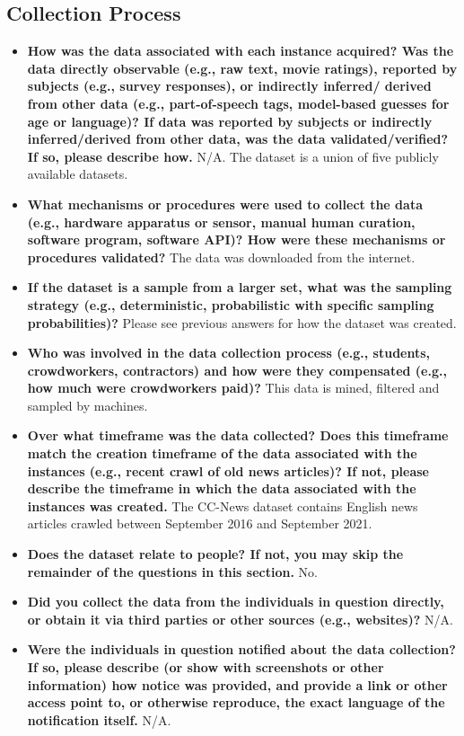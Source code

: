 \documentclass[11pt]{article}
\begin{document}
\subsection{Collection Process}
\begin{itemize}
    \item \textbf{How was the data associated with each instance acquired? Was the data directly observable (e.g., raw text, movie ratings), reported by subjects (e.g., survey responses), or indirectly inferred/ derived from other data (e.g., part-of-speech tags, model-based guesses for age or language)? If data was reported by subjects or indirectly inferred/derived from other data, was the data validated/verified? If so, please describe how.} N/A. The dataset is a union of five publicly available datasets.
    \item \textbf{What mechanisms or procedures were used to collect the data (e.g., hardware apparatus or sensor, manual human curation, software program, software API)? How were these mechanisms or procedures validated?} The data was downloaded from the internet.
    \item \textbf{If the dataset is a sample from a larger set, what was the sampling strategy (e.g., deterministic, probabilistic with specific sampling probabilities)?} Please see previous answers for how the dataset was created.
    \item \textbf{Who was involved in the data collection process (e.g., students, crowdworkers, contractors) and how were they compensated (e.g., how much were crowdworkers paid)?} This data is mined, filtered and sampled by machines.
    \item \textbf{Over what timeframe was the data collected? Does this timeframe match the creation timeframe of the data associated with the instances (e.g., recent crawl of old news articles)? If not, please describe the timeframe in which the data associated with the instances was created.} The CC-News dataset contains English news articles crawled between September 2016 and September 2021.
    \item \textbf{Does the dataset relate to people? If not, you may skip the remainder of the questions in this section.} No.
    \item \textbf{Did you collect the data from the individuals in question directly, or obtain it via third parties or other sources (e.g., websites)?} N/A.
    \item \textbf{Were the individuals in question notified about the data collection? If so, please describe (or show with screenshots or other information) how notice was provided, and provide a link or other access point to, or otherwise reproduce, the exact language of the notification itself.} N/A.

\end{itemize}
\end{document}

